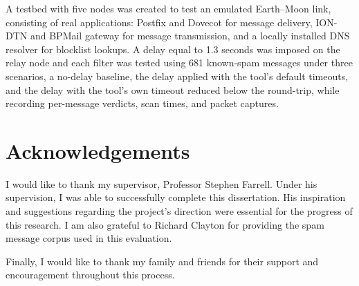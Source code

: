\documentclass[a4paper,oneside,12pt]{book}
\begin{document}
A testbed with five nodes was created to test an emulated Earth–Moon link, consisting of real applications: Postfix and Dovecot for message delivery, ION-DTN and BPMail gateway for message transmission, and a locally installed DNS resolver for blocklist lookups. A delay equal to 1.3 seconds was imposed on the relay node and each filter was tested using 681 known-spam messages under three scenarios, a no-delay baseline, the delay applied with the tool's default timeouts, and the delay with the tool's own timeout reduced below the round-trip, while recording per-message verdicts, scan times, and packet captures.



\newpage
\raggedright %

\section*{\Huge{Acknowledgements}}
I would like to thank my supervisor, Professor Stephen Farrell. Under his supervision, I was able to successfully complete this dissertation. His inspiration and suggestions regarding the project's direction were essential for the progress of this research.
I am also grateful to Richard Clayton for providing the spam message corpus used in this evaluation.

Finally, I would like to thank my family and friends for their support and encouragement throughout this process.
\tableofcontents
\newpage \listoffigures
\newpage \listoftables
\newpage
\end{document}
